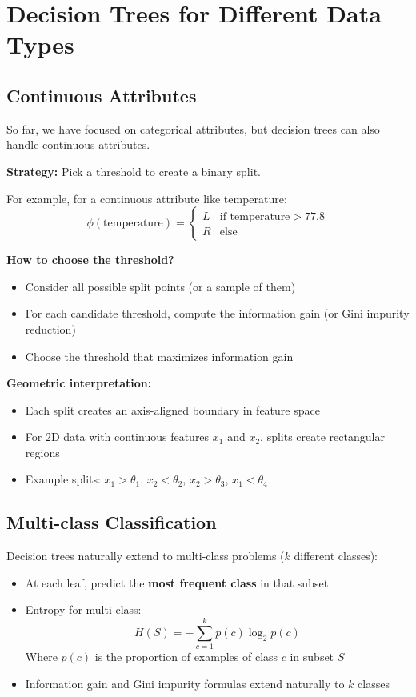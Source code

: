 \documentclass[11pt,a4paper]{article}
\theoremstyle{definition}
\theoremstyle{plain}
\theoremstyle{remark}
\begin{document}
\section{Decision Trees for Different Data Types}

\subsection{Continuous Attributes}

So far, we have focused on categorical attributes, but decision trees can also handle continuous attributes.

\textbf{Strategy:} Pick a threshold to create a binary split.

For example, for a continuous attribute like temperature:
\[
\phi(\text{temperature}) = \begin{cases}
L & \text{if temperature} > 77.8 \\
R & \text{else}
\end{cases}
\]

\textbf{How to choose the threshold?}
\begin{itemize}
    \item Consider all possible split points (or a sample of them)
    \item For each candidate threshold, compute the information gain (or Gini impurity reduction)
    \item Choose the threshold that maximizes information gain
\end{itemize}

\textbf{Geometric interpretation:}
\begin{itemize}
    \item Each split creates an axis-aligned boundary in feature space
    \item For 2D data with continuous features \(x_1\) and \(x_2\), splits create rectangular regions
    \item Example splits: \(x_1 > \theta_1\), \(x_2 < \theta_2\), \(x_2 > \theta_3\), \(x_1 < \theta_4\)
\end{itemize}

\subsection{Multi-class Classification}

Decision trees naturally extend to multi-class problems (\(k\) different classes):

\begin{itemize}
    \item At each leaf, predict the \textbf{most frequent class} in that subset
    
    \item Entropy for multi-class:
    \[
    H(S) = -\sum_{c=1}^{k} p(c) \log_2 p(c)
    \]
    Where \(p(c)\) is the proportion of examples of class \(c\) in subset \(S\)
    
    \item Information gain and Gini impurity formulas extend naturally to \(k\) classes
\end{itemize}
\end{document}
